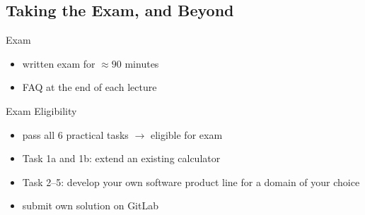 


\subsection{Taking the Exam, and Beyond}

\begin{frame}[label=Exam]{\myframetitle}
	\begin{fancycolumns}
		\begin{definition}{Exam}
			\begin{itemize}
				\item written exam for $\approx 90$ minutes
				\item FAQ at the end of each lecture
			\end{itemize}
		\end{definition}
		\begin{definition}{Exam Eligibility } %
			\begin{itemize}
				\item pass all 6 practical tasks $\rightarrow$ eligible for exam
				\item Task 1a and 1b: extend an existing calculator
				\item Task 2--5: develop your own software product line for a domain of your choice
				\item submit own solution on GitLab
			\end{itemize}
		\end{definition}
	\nextcolumn
		


\end{fancycolumns}
\end{frame}
